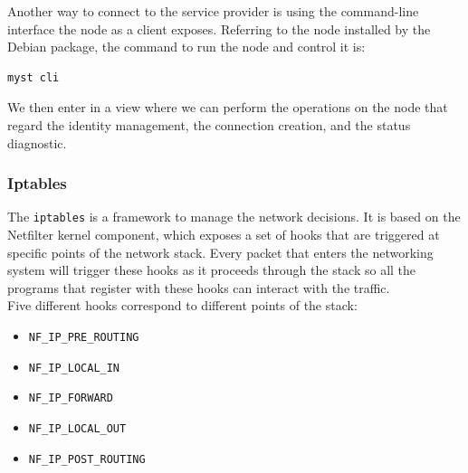 \documentclass[12pt]{article}
\begin{document}
	Another way to connect to the service provider is using the command-line interface the node as a client exposes. Referring to the node installed by the Debian package, the command to run the node and control it is:\\
	
	\begin{lstlisting}[frame=single]
		myst cli
	\end{lstlisting}

	We then enter in a view where we can perform the operations on the node that regard the identity management, the connection creation, and the status diagnostic.

	\subsubsection{Iptables}

	The \lstinline{iptables} is a framework to manage the network decisions. It is based on the Netfilter kernel component, which exposes a set of hooks that are triggered at specific points of the network stack. Every packet that enters the networking system will trigger these hooks as it proceeds through the stack so all the programs that register with these hooks can interact with the traffic.\\
	\bigbreak
	Five different hooks correspond to different points of the stack:\\

	\bigbreak
	\begin{itemize}
		\item \lstinline{NF_IP_PRE_ROUTING}
		\item \lstinline{NF_IP_LOCAL_IN}
		\item \lstinline{NF_IP_FORWARD}
		\item \lstinline{NF_IP_LOCAL_OUT}
		\item \lstinline{NF_IP_POST_ROUTING}
	\end{itemize}
	\bigbreak
\end{document}
